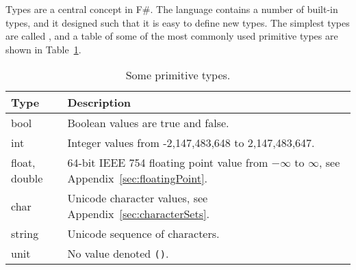 Types are a central concept in F\#. The language contains a number of built-in types, and it designed such that it is easy to define new types. The simplest types are called , and a table of some of the most commonly used primitive types are shown in Table~\ref{tab:primitiveTypes}.
\begin{table}
  \centering
  \begin{tabularx}{0.75\textwidth}{|l|X|}
    \hline
    Type & Description\\
    \hline
    bool & Boolean values are true and false.\\
    int & Integer values from -2,147,483,648 to 2,147,483,647.\\
    float, double & 64-bit IEEE 754 floating point value from $-\infty$ to $\infty$, see Appendix~\ref{sec:floatingPoint}.\\
    char & Unicode character values, see Appendix~\ref{sec:characterSets}.\\
    string & Unicode sequence of characters.\\
    unit & No value denoted \texttt{()}.\\
    \hline
  \end{tabularx}
  \caption{Some primitive types.}
  \label{tab:primitiveTypes}
\end{table}
\begin{comment}
  \begin{table}
    \centering
    \begin{tabularx}{0.75\textwidth}{|l|X|}
      \hline
      Type & Description\\
      \hline
      decimal &A floating point data type that has at least 28 significant digits.\\
      byte &Integer values from 0 to 255.\\
      sbyte &Integer values from -128 to 127.\\
      int16 &Integer values from -32768 to 32767.\\
      uint16 &Integer values from 0 to 65535.\\
      uint32 &Integer values from 0 to 4,294,967,295.\\
      int64 &Integer values from -9,223,372,036,854,775,808 to 9,223,372,036,854,775,807.\\
      uint64 &Integer values from 0 to 18,446,744,073,709,551,615.\\
      nativeint &A native pointer as a signed integer.\\
      unativeint &A native pointer as an unsigned integer.\\
      void &Indicates no type or value.\\
      float32, single &A 32-bit floating point type.\\
      \hline
    \end{tabularx}
    \caption{Other primitive types.}
    \label{tab:otherPrimitiveTypes}
  \end{table}
\end{comment}
